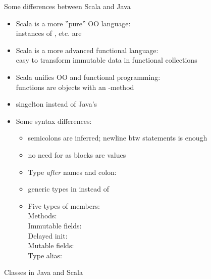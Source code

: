 \documentclass{lecturenotes}
\begin{document}
\begin{Slide}{Some differences between Scala and Java}\footnotesize
\begin{itemize}
\item Scala is a more ''pure'' OO language: \\ instances of , etc. are  
\item Scala is a more advanced functional language: \\ easy to transform immutable data in functional collections
\item Scala unifies OO and functional programming: \\ functions are objects with an -method
\item singelton  instead of Java's 

\item Some syntax differences: \pause
\begin{itemize}\fontsize{8}{9}\selectfont
\item semicolons are inferred; newline btw statements is enough
\item no need for  as blocks are values
\item Type \emph{after} names and colon: 
\item generic types in \code{[T]} instead of 
\item Five types of members: 
\\ Methods:  
\\ Immutable fields:  
\\  Delayed init:  
\\  Mutable fields:  
\\  Type alias: 
\end{itemize}


\end{itemize}

\end{Slide}

\begin{Slide}{Classes in Java and Scala}
\vspace{-1.5em}
\begin{multicols}{2}


\columnbreak

\pause


\pause


\end{multicols}

\end{Slide}
\end{document}
